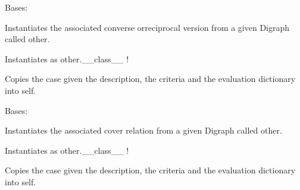\documentclass[letterpaper,10pt,english]{sphinxmanual}
\begin{document}

\begin{fulllineitems}
\label{techDoc:digraphs.ConverseDigraph}
Bases: {\hyperref[techDoc:digraphs.Digraph]{\emph{}}}

Instantiates the associated converse orreciprocal version from
a given Digraph called other.

Instantiates as other.\_\_class\_\_ !

Copies the case given the description, the criteria
and the evaluation dictionary into self.

\end{fulllineitems}


\begin{fulllineitems}
\label{techDoc:digraphs.CoverDigraph}
Bases: {\hyperref[techDoc:digraphs.Digraph]{\emph{}}}

Instantiates the associated cover relation from
a given Digraph called other.

Instantiates as other.\_\_class\_\_ !

Copies the case given the description, the criteria
and the evaluation dictionary into self.

\end{fulllineitems}

\end{document}
